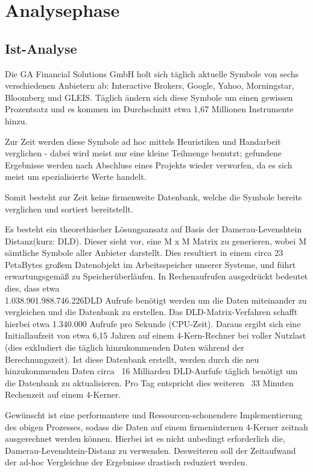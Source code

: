 \section{Analysephase}
\subsection{Ist-Analyse}
Die GA Financial Solutions GmbH holt sich täglich aktuelle Symbole von sechs verschiedenen
Anbietern ab: Interactive Brokers, Google, Yahoo, Morningstar, Bloomberg und GLEIS.
Täglich ändern sich diese Symbole um einen gewissen Prozentsatz und es kommen im Durchschnitt etwa 1,67 Millionen Instrumente hinzu.\par

Zur Zeit werden diese Symbole ad hoc mittels Heuristiken und Handarbeit verglichen -
dabei wird meist nur eine kleine Teilmenge benutzt; gefundene Ergebnisse werden
nach Abschluss eines Projekts wieder verworfen, da es sich meist um spezialisierte Werte handelt.\par

Somit besteht zur Zeit keine firmenweite Datenbank, welche die Symbole
bereits verglichen und sortiert bereitstellt.\par

Es besteht ein theorethischer Lösungsansatz auf Basis der Damerau-Levenshtein Distanz\footnotemark (kurz: DLD). Dieser sieht vor, eine M x M Matrix zu generieren, wobei M sämtliche Symbole aller
Anbieter darstellt. Dies resultiert in einem circa 23 PetaBytes großem Datenobjekt
im Arbeitsspeicher unserer Systeme, und führt erwartungsgemäß zu Speicherüberläufen.
In Rechenaufrufen ausgedrückt bedeutet dies, dass etwa \\
1.038.901.988.746.226\footnotemark DLD Aufrufe benötigt werden um die Daten miteinander 
zu vergleichen und die Datenbank zu erstellen. Das DLD-Matrix-Verfahren schafft hierbei 
etwa 1.340.000 Aufrufe pro Sekunde (CPU-Zeit).
Daraus ergibt sich eine Initiallaufzeit von etwa 6,15 Jahren auf einem 4-Kern-Rechner bei voller Nutzlast (dies exkludiert die täglich hinzukommenden Daten
während der Berechnungszeit). Ist diese Datenbank erstellt, werden durch die neu
hinzukommenden Daten circa ~16 Milliarden DLD-Aurfufe täglich benötigt um die
Datenbank zu aktualisieren. Pro Tag entspricht dies weiteren ~33 Minuten Rechenzeit auf
einem 4-Kerner.\par

Gewünscht ist eine performantere und Ressourcen-schonendere Implementierung des obigen Prozesses,
sodass die Daten auf einem firmeninternen 4-Kerner zeitnah ausgerechnet werden können.
Hierbei ist es nicht unbedingt erforderlich die, Damerau-Levenshtein-Distanz zu verwenden. Desweiteren soll der Zeitaufwand der ad-hoc 
Vergleichue der Ergebnisse drastisch reduziert werden.\par

